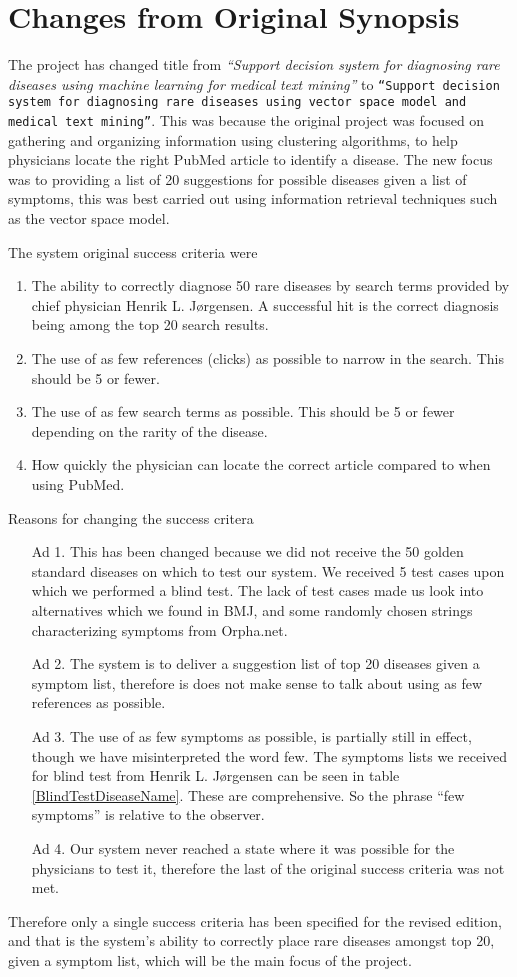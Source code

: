 \chapter*{Changes from Original Synopsis}

The project has changed title from \textit{``Support decision system
  for diagnosing rare diseases using machine learning for medical text
  mining''} to \texttt{``Support decision system for diagnosing rare
  diseases using vector space model and \\ medical text
  mining''}. This was because the original project was focused on
gathering and organizing information using clustering algorithms, to
help physicians locate the right PubMed article to identify a
disease. The new focus was to providing a list of 20 suggestions for
possible diseases given a list of symptoms, this was best carried out using
information retrieval techniques such as the vector space model.

The system original success criteria were
\begin{enumerate}
\item The ability to correctly diagnose 50 rare diseases by search
  terms provided by chief physician Henrik L. J\o rgensen. A
  successful hit is the correct diagnosis being among the top 20
  search results.
\item The use of as few references (clicks) as possible to narrow in
  the search. This should be 5 or fewer.
\item The use of as few search terms as possible. This should be 5 or
  fewer depending on the rarity of the disease.
\item How quickly the physician can locate the correct article
  compared to when using PubMed.
\end{enumerate}

Reasons for changing the success critera
\begin{itemize}
\item[Ad 1.] This has been changed because we did not receive the 50 golden
standard diseases on which to test our system. We received 5 test
cases upon which we performed a blind test. The lack of test cases made
us look into alternatives which we found in BMJ, and some randomly
chosen strings characterizing symptoms from Orpha.net.

\item[Ad 2.] The system is to deliver a suggestion list of top 20 diseases given a
symptom list, therefore is does not make sense to talk about using as
few references as possible.

\item[Ad 3.] The use of as few symptoms as possible, is partially still in effect,
though we have misinterpreted the word few. The symptoms lists we
received for blind test from Henrik L. J\o rgensen can be seen in
table \ref{BlindTestDiseaseName}. These are comprehensive. So the
phrase ``few symptoms'' is relative to the observer.

\item[Ad 4.] Our system never reached a state where it was possible for the
physicians to test it, therefore the last of the original success
criteria was not met.
\end{itemize}

Therefore only a single success criteria has been specified for the revised
edition, and that is the system's ability to correctly place rare
diseases amongst top 20, given a symptom list, which will be the main
focus of the project.
